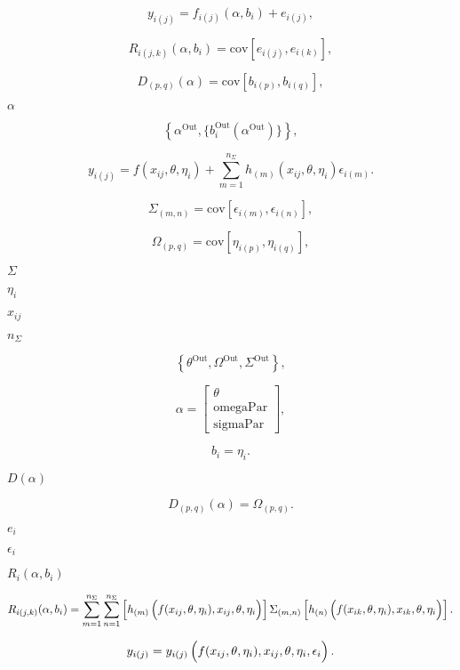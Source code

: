 \documentclass{article}
\begin{document}
\[ y_{i(j)} = f_{i(j)}(\alpha, b_i) + e_{i(j)} , \]
\pagebreak

\[ R_{i(j,k)}(\alpha, b_i) = \mbox{cov}[e_{i(j)},e_{i(k)}] , \]
\pagebreak

\[ D_{(p,q)}(\alpha) = \mbox{cov}[b_{i(p)},b_{i(q)}] , \]
\pagebreak

$\alpha$
\pagebreak

\[ \left\{ \alpha^{\mbox{Out}}, \{ b_i^{\mbox{Out}} ( \alpha^{\mbox{Out}} ) \} \right\} , \]
\pagebreak

\[ y_{i(j)} = f(x_{ij}, \theta, \eta_i) + \sum_{m=1}^{n_{\Sigma}} h_{(m)}(x_{ij}, \theta, \eta_i) \epsilon_{i(m)} . \]
\pagebreak

\[ \Sigma_{(m,n)} = \mbox{cov}[\epsilon_{i(m)},\epsilon_{i(n)}] , \]
\pagebreak

\[ \Omega_{(p,q)} = \mbox{cov}[\eta_{i(p)},\eta_{i(q)}] , \]
\pagebreak

$\Sigma$
\pagebreak

$\eta_i$
\pagebreak

$x_{ij}$
\pagebreak

$n_{\Sigma}$
\pagebreak

\[ \left\{ \theta^{\mbox{Out}}, \Omega^{\mbox{Out}}, \Sigma^{\mbox{Out}} \right\} , \]
\pagebreak

\[ \alpha = \left[ \begin{array}{c} \theta \\ \mbox{omegaPar} \\ \mbox{sigmaPar} \end{array} \right] , \]
\pagebreak

\[ b_i = \eta_i . \]
\pagebreak

$D(\alpha)$
\pagebreak

\[ D_{(p,q)}(\alpha) = \Omega_{(p,q)} . \]
\pagebreak

$e_i$
\pagebreak

$\epsilon_i$
\pagebreak

$R_i(\alpha, b_i)$
\pagebreak

\[ R_{i(j,k)}(\alpha, b_i) = \sum_{m=1}^{n_{\Sigma}} \sum_{n=1}^{n_{\Sigma}} \left[ h_{(m)}\left( \rule{0.0in}{0.15in} f(x_{ij}, \theta, \eta_i), x_{ij}, \theta, \eta_i \right) \right] \Sigma_{(m,n)} \left[ h_{(n)}\left( \rule{0.0in}{0.15in} f(x_{ik}, \theta, \eta_i), x_{ik}, \theta, \eta_i \right) \right] . \]
\pagebreak

\[ y_{i(j)} = y_{i(j)}\left( \rule{0.0in}{0.15in} f(x_{ij}, \theta, \eta_i), x_{ij}, \theta, \eta_i, \epsilon_i \right) . \]
\pagebreak
\end{document}
